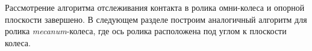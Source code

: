 

Рассмотрение алгоритма отслеживания контакта в ролика омни-колеса и опорной плоскости завершено. В следующем разделе построим аналогичный алгоритм для ролика \textit{mecanum}-колеса, где ось ролика расположена под углом к плоскости колеса.